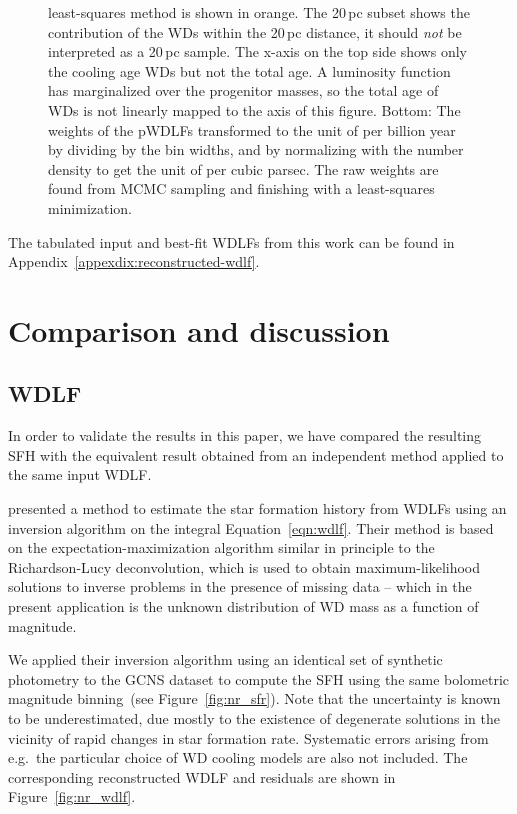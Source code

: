 \documentclass[fleqn,usenatbib]{mnras}
\begin{document}
\begin{figure}
{    least-squares method is shown in orange. The 20\,pc subset shows the
    contribution of the WDs within the 20\,pc distance, it should \textit{not}
    be interpreted as a 20\,pc sample. The x-axis on the top side shows only the
    cooling age WDs but not the total age. A luminosity function has
    marginalized over the progenitor masses, so the total age of WDs is not
    linearly mapped to the axis of this figure. Bottom: The weights of the
    pWDLFs transformed to the unit of per billion year by dividing by the bin
    widths, and by normalizing with the number density to get the unit of per
    cubic parsec. The raw weights are found from MCMC sampling and finishing
    with a least-squares minimization.}
    \label{fig:sfh_optimal}
\end{figure}

The tabulated input and best-fit WDLFs from this work can be found in
Appendix~\ref{appexdix:reconstructed-wdlf}.

\section{Comparison and discussion}
\label{sec:comparison}

\subsection{WDLF}
\label{sec:inversion}
In order to validate the results in this paper, we have compared the
resulting SFH with the equivalent result obtained from an
independent method applied to the same input WDLF.

\citet{2013MNRAS.434.1549R} presented a method to estimate the star formation
history from WDLFs using an inversion algorithm on the integral 
Equation~\ref{eqn:wdlf}. Their method is based on the expectation-maximization
algorithm similar in principle to the Richardson-Lucy deconvolution, which is
used to obtain maximum-likelihood solutions to inverse problems in the presence 
of missing data -- which in the present application is the unknown distribution
of WD mass as a function of magnitude.

We applied their inversion algorithm using an identical set of synthetic
photometry to the GCNS dataset to compute the SFH using the same bolometric
magnitude binning~(see Figure~\ref{fig:nr_sfr}). Note that the uncertainty is 
known to be underestimated, due mostly to the existence of degenerate solutions
in the vicinity of rapid changes in star formation rate. Systematic errors
arising from e.g.~the particular choice of WD cooling models are also not
included. The corresponding
reconstructed WDLF and residuals are shown in Figure~\ref{fig:nr_wdlf}.
\end{document}
